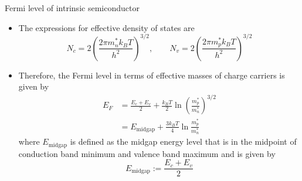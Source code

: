 %
%
\begin{frame}[label=pre-M2T1-slot1]{Fermi level of intrinsic semiconductor}
\begin{small}
		\begin{itemize}
		\item The expressions for effective density of states are
		\[
		N_c = 2\left(\frac{2\pi m_n^* k_B T}{h^2}\right)^{3/2}, \qquad N_v = 2\left(\frac{2\pi m_p^* k_B T}{h^2}\right)^{3/2}
		\]
		\item Therefore, the Fermi level in terms of effective masses of charge carriers is given by
		\begin{align*}
			E_F &= \frac{E_c+E_v}{2} + \frac{k_BT}{2}\ln \left(\frac{m_p^*}{m_n^*}\right)^{3/2}	\\
			& = E_\text{midgap} + \frac{3k_BT}{4} \ln \frac{m_p^*}{m_n^*}
		\end{align*}
		where \(E_\text{midgap}\) is defined as the midgap energy level that is in the midpoint of conduction band minimum and valence band maximum and is given by
		\[
		E_\text{midgap} := \frac{E_c+E_v}{2}
		\]
		\begin{center}
		\end{center}
	\end{itemize}
\end{small}
\end{frame}
%
